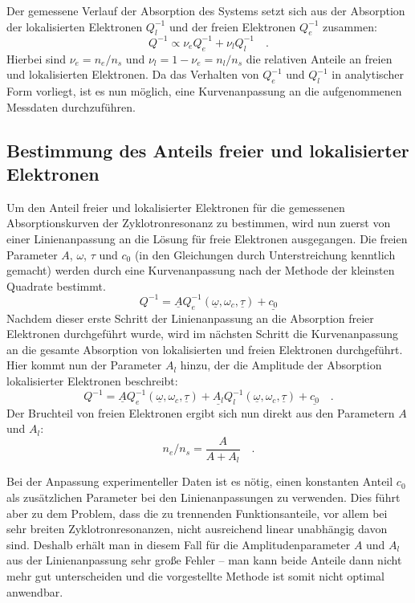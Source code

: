 Der gemessene Verlauf der Absorption des Systems setzt sich aus der Absorption der lokalisierten Elektronen $Q^{-1}_l$ und der freien Elektronen $Q^{-1}_e$ zusammen:
    \begin{equation}
        \label{eqn:Qgesamt}
        Q^{-1}\propto \nu_eQ^{-1}_e+\nu_lQ^{-1}_l\quad.
    \end{equation}
Hierbei sind $\nu_e=n_e/n_s$ und $\nu_l=1-\nu_e=n_l/n_s$ die relativen Anteile an freien und lokalisierten Elektronen. Da das Verhalten von $Q^{-1}_e$ und $Q^{-1}_l$ in analytischer Form vorliegt, ist es nun möglich, eine Kurvenanpassung an die aufgenommenen Messdaten durchzuführen.

\subsection{Bestimmung des Anteils freier und lokalisierter Elektronen}

Um den Anteil freier und lokalisierter Elektronen für die gemessenen Absorptionskurven der Zyklotronresonanz zu bestimmen, wird nun zuerst von einer Linienanpassung an die Lösung für freie Elektronen ausgegangen. Die freien Parameter $A$, $\omega$, $\tau$ und $c_0$ (in den Gleichungen durch Unterstreichung kenntlich gemacht) werden durch eine Kurvenanpassung nach der Methode der kleinsten Quadrate bestimmt.
\begin{equation}
	Q^{-1}=\underline{A}Q^{-1}_e(\underline{\omega},\omega_c,\underline{\tau})+\underline{c_0}
\end{equation}
Nachdem dieser erste Schritt der Linienanpassung an die Absorption freier Elektronen durchgeführt wurde, wird im nächsten Schritt die Kurvenanpassung an die gesamte Absorption von lokalisierten und freien Elektronen durchgeführt. Hier kommt nun der Parameter $A_l$ hinzu, der die Amplitude der Absorption lokalisierter Elektronen beschreibt:
\begin{equation}
	\label{eqn:2frac_total_absorp}
	Q^{-1}=\underline{A}Q^{-1}_e(\underline{\omega},\omega_c,\underline{\tau})+\underline{A_l}Q^{-1}_l(\underline{\omega},\omega_c,\underline{\tau})+\underline{c_0}\quad.
\end{equation}
Der Bruchteil von freien Elektronen ergibt sich nun direkt aus den Parametern $A$ und $A_l$:
\begin{equation}
	n_e/n_s = \frac{A}{A+A_l}\quad.
\end{equation}

Bei der Anpassung experimenteller Daten ist es nötig, einen konstanten Anteil $c_0$ als zusätzlichen Parameter bei den Linienanpassungen zu verwenden. Dies führt aber zu dem  Problem, dass die zu trennenden Funktionsanteile, vor allem bei sehr breiten Zyklotronresonanzen, nicht ausreichend linear unabhängig davon sind. Deshalb erhält man in diesem Fall für die Amplitudenparameter $A$ und $A_l$ aus der Linienanpassung sehr große Fehler -- man kann beide Anteile dann nicht mehr gut unterscheiden und die vorgestellte Methode ist somit nicht optimal anwendbar.
